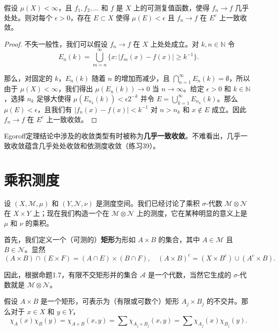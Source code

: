 \documentclass[lang=cn,10pt,thmcnt=section]{elegantbook}
\begin{document}
\begin{theorem}[Egoroff定理]\label{theorem2.33}
假设 $\mu(X) < \infty$，且 $f_1, f_2, \ldots$ 和 $f$ 是 $X$ 上的可测复值函数，使得 $f_n \to f$ 几乎处处。则对每个 $\epsilon > 0$，存在 $E \subset X$ 使得 $\mu(E) < \epsilon$ 且 $f_n \to f$ 在 $E^c$ 上一致收敛。
\end{theorem}

\begin{proof}
不失一般性，我们可以假设 $f_n \to f$ 在 $X$ 上处处成立。对 $k, n \in \mathbb{N}$ 令
\[ E_n(k) = \bigcup_{m=n}^{\infty} \{x : |f_m(x) - f(x)| \geq k^{-1}\}. \]

那么，对固定的 $k$，$E_n(k)$ 随着 $n$ 的增加而减少，且 $\bigcap_{n=1}^{\infty} E_n(k) = \emptyset$，所以由于 $\mu(X) < \infty$，我们得出 $\mu(E_n(k)) \to 0$ 当 $n \to \infty$。给定 $\epsilon > 0$ 和 $k \in \mathbb{N}$，选择 $n_k$ 足够大使得 $\mu(E_{n_k}(k)) < \epsilon 2^{-k}$ 并令 $E = \bigcup_{k=1}^{\infty} E_{n_k}(k)$。那么 $\mu(E) < \epsilon$，且我们有 $|f_n(x) - f(x)| < k^{-1}$ 对 $n > n_k$ 和 $x \notin E$ 成立。因此 $f_n \to f$ 在 $E^c$ 上一致收敛。
\end{proof}

Egoroff定理结论中涉及的收敛类型有时被称为\textbf{几乎一致收敛}。不难看出，几乎一致收敛蕴含几乎处处收敛和依测度收敛（练习39）。

\section{乘积测度}

设 $(X, \mathcal{M}, \mu)$ 和 $(Y, \mathcal{N}, \nu)$ 是测度空间。我们已经讨论了乘积 $\sigma$-代数 $\mathcal{M} \otimes \mathcal{N}$ 在 $X \times Y$ 上；现在我们构造一个在 $\mathcal{M} \otimes \mathcal{N}$ 上的测度，它在某种明显的意义上是 $\mu$ 和 $\nu$ 的乘积。

首先，我们定义一个（可测的）\textbf{矩形}为形如 $A \times B$ 的集合，其中 $A \in \mathcal{M}$ 且 $B \in \mathcal{N}$。显然
\[ (A \times B) \cap (E \times F) = (A \cap E) \times (B \cap F), \quad (A \times B)^c = (X \times B^c) \cup (A^c \times B). \]

因此，根据命题1.7，有限不交矩形并的集合 $\mathcal{A}$ 是一个代数，当然它生成的 $\sigma$-代数就是 $\mathcal{M} \otimes \mathcal{N}$。

假设 $A \times B$ 是一个矩形，可表示为（有限或可数个）矩形 $A_j \times B_j$ 的不交并。那么对于 $x \in X$ 和 $y \in Y$，
\[ \chi_A(x)\chi_B(y) = \chi_{A \times B}(x, y) = \sum \chi_{A_j \times B_j}(x, y) = \sum \chi_{A_j}(x)\chi_{B_j}(y). \]
\end{document}

